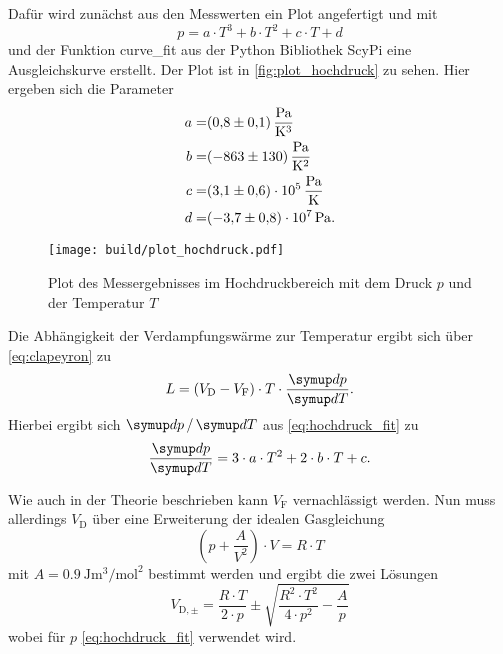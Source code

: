 Dafür wird zunächst aus den Messwerten ein Plot angefertigt und mit
\begin{equation}
    p = a \cdot T^3 + b \cdot T^2 + c \cdot T + d
    \label{eq:hochdruck_fit}
\end{equation}
und der Funktion curve\_fit aus der Python Bibliothek ScyPi eine Ausgleichskurve erstellt.\cite{scipy}
Der Plot ist in \autoref{fig:plot_hochdruck} zu sehen.
Hier ergeben sich die Parameter
\begin{align*}
    a =& \SI{0.8+-0.1}{\pascal\per\kelvin\cubed} \\
    b =& \SI{-863+-130}{\pascal\per\kelvin\squared} \\
    c =& \SI{3.1+-0.6e5}{\pascal\per\kelvin} \\
    d =& \SI{-3.7+-0.8e7}{\pascal}.
\end{align*}

\begin{figure}
    \centering
    \texttt{[image: build/plot\_hochdruck.pdf]}
    \caption{Plot des Messergebnisses im Hochdruckbereich mit dem Druck $p$ und der Temperatur $T$}
    \label{fig:plot_hochdruck}
\end{figure}

Die Abhängigkeit der Verdampfungswärme zur Temperatur ergibt sich über \autoref{eq:clapeyron} zu
\begin{equation}
    L = (V_\text{D}-V_\text{F}) \cdot T \cdot \frac{\dif{p}}{\dif{T}}.
    \label{eq:hochdruck_ergebnis}
\end{equation}
Hierbei ergibt sich $\dif{p}/\dif{T}$ aus \autoref{eq:hochdruck_fit} zu
\begin{equation}
    \frac{\dif{p}}{\dif{T}} = 3 \cdot a \cdot T^2 + 2 \cdot b \cdot T + c.
    \label{eq:ableitung}
\end{equation}

Wie auch in der Theorie beschrieben kann $V_\text{F}$ vernachlässigt werden. 
Nun muss allerdings $V_\text{D}$ über eine Erweiterung der idealen Gasgleichung
\begin{equation}
    \left( p + \frac{A}{V^2} \right) \cdot V = R \cdot T
\end{equation}
mit $A = \SI{0.9}{\joule\meter\cubed\per\mol\squared}$ bestimmt werden und ergibt die zwei Lösungen
\begin{equation}
    V_{\text{D},\pm} = \frac{R \cdot T}{2 \cdot p} \pm \sqrt{\frac{R^2 \cdot T^2}{4 \cdot p^2} - \frac{A}{p}}
\end{equation}
wobei für $p$ \autoref{eq:hochdruck_fit} verwendet wird.\cite{V203}

